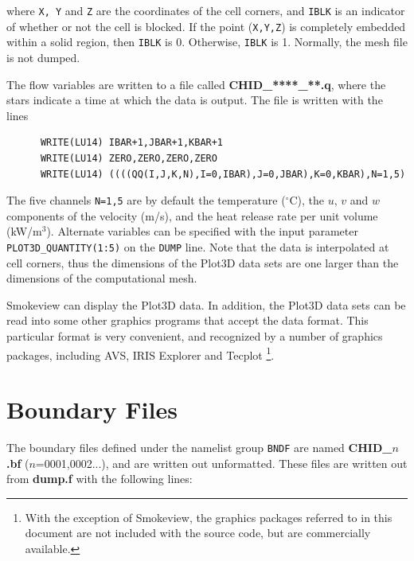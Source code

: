 \documentclass[11pt]{book}
\newcommand{\ct}{\tt\small}
\begin{document}
\noindent
where {\ct X, Y} and {\ct Z} are the coordinates of the cell corners,
and {\ct IBLK} is an indicator of whether or not the cell is blocked.
If the point ({\ct X,Y,Z}) is completely embedded within a solid region,
then {\ct IBLK} is 0. Otherwise, {\ct IBLK} is 1. Normally, the mesh
file is not dumped.

The flow variables are written to a file called {\bf CHID\_****\_**.q},
where the stars indicate a time at which the data is output.
The file is written with the lines

\footnotesize
\begin{verbatim}
      WRITE(LU14) IBAR+1,JBAR+1,KBAR+1
      WRITE(LU14) ZERO,ZERO,ZERO,ZERO
      WRITE(LU14) ((((QQ(I,J,K,N),I=0,IBAR),J=0,JBAR),K=0,KBAR),N=1,5)
\end{verbatim}
\normalsize
The five channels {\ct N=1,5} are by default the temperature
($^\circ$C), the $u$, $v$ and
$w$ components of the velocity (m/s), and the heat release rate
per unit volume (kW/m$^3$). Alternate variables can be specified with
the input parameter {\ct PLOT3D\_QUANTITY(1:5)} on the {\ct DUMP} line.
Note that the data is interpolated at
cell corners, thus the dimensions of the Plot3D data sets are
one larger than the dimensions of the computational mesh.

Smokeview can display the Plot3D data. In
addition, the Plot3D data sets can be read into some other graphics
programs that accept the data format.
This particular format is very convenient, and recognized by
a number of graphics packages, including AVS, IRIS Explorer
and Tecplot
\footnote{With the exception of Smokeview,
the graphics packages referred to in this document are
not included with the source code, but are commercially available.}.


\section{Boundary Files}
\label{out:BNDF}
The boundary files defined under the namelist group {\ct BNDF} are
named {\bf CHID\_$n$.bf} ($n$=0001,0002...),
and are written out unformatted.
These files are written out from {\bf dump.f} with the following lines:
\end{document}
